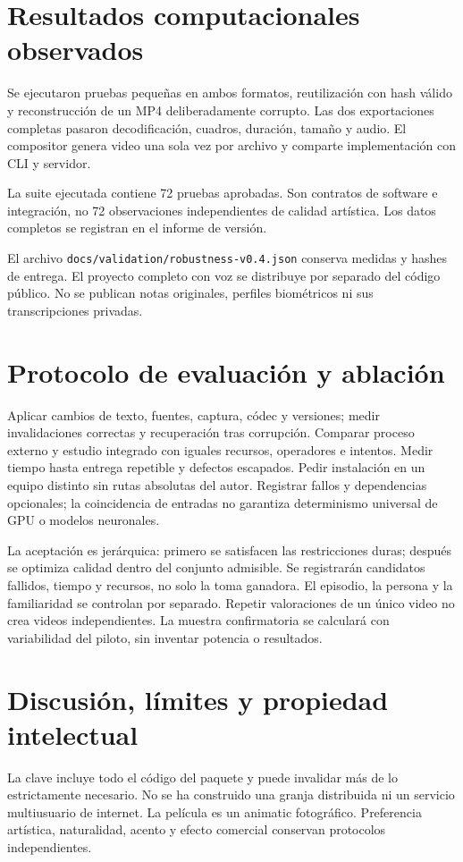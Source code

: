 \documentclass[10pt,a4paper]{article}
\begin{document}
\section{Resultados computacionales observados}
Se ejecutaron pruebas pequeñas en ambos formatos, reutilización con hash válido y reconstrucción de un MP4 deliberadamente corrupto. Las dos exportaciones completas pasaron decodificación, cuadros, duración, tamaño y audio. El compositor genera video una sola vez por archivo y comparte implementación con CLI y servidor.

La suite ejecutada contiene 72 pruebas aprobadas. Son contratos de software e integración, no 72 observaciones independientes de calidad artística. Los datos completos se registran en el informe de versión.

El archivo \texttt{docs/validation/robustness-v0.4.json} conserva medidas y hashes de entrega. El proyecto completo con voz se distribuye por separado del código público. No se publican notas originales, perfiles biométricos ni sus transcripciones privadas.
\section{Protocolo de evaluación y ablación}
Aplicar cambios de texto, fuentes, captura, códec y versiones; medir invalidaciones correctas y recuperación tras corrupción. Comparar proceso externo y estudio integrado con iguales recursos, operadores e intentos. Medir tiempo hasta entrega repetible y defectos escapados. Pedir instalación en un equipo distinto sin rutas absolutas del autor. Registrar fallos y dependencias opcionales; la coincidencia de entradas no garantiza determinismo universal de GPU o modelos neuronales.

La aceptación es jerárquica: primero se satisfacen las restricciones duras; después se optimiza calidad dentro del conjunto admisible. Se registrarán candidatos fallidos, tiempo y recursos, no solo la toma ganadora. El episodio, la persona y la familiaridad se controlan por separado. Repetir valoraciones de un único video no crea videos independientes. La muestra confirmatoria se calculará con variabilidad del piloto, sin inventar potencia o resultados.
\section{Discusión, límites y propiedad intelectual}
La clave incluye todo el código del paquete y puede invalidar más de lo estrictamente necesario. No se ha construido una granja distribuida ni un servicio multiusuario de internet. La película es un animatic fotográfico. Preferencia artística, naturalidad, acento y efecto comercial conservan protocolos independientes.
\end{document}
